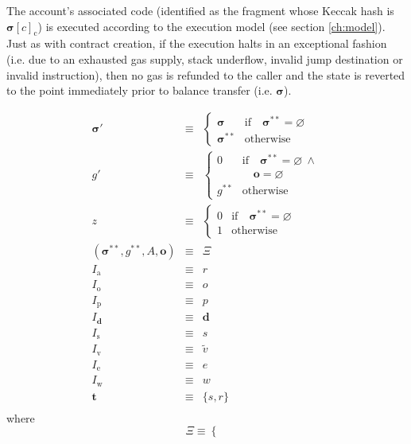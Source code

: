 \documentclass[9pt,oneside]{amsart}
\begin{document}
\begin{multicols}{2}
The account's associated code (identified as the fragment whose Keccak hash is $\boldsymbol{\sigma}[c]_{\mathrm{c}}$) is executed according to the execution model (see section \ref{ch:model}). Just as with contract creation, if the execution halts in an exceptional fashion (i.e. due to an exhausted gas supply, stack underflow, invalid jump destination or invalid instruction), then no gas is refunded to the caller and the state is reverted to the point immediately prior to balance transfer (i.e. $\boldsymbol{\sigma}$).

\begin{eqnarray}
\boldsymbol{\sigma}' & \equiv & \begin{cases}
\boldsymbol{\sigma} & \text{if} \quad \boldsymbol{\sigma}^{**} = \varnothing \\
\boldsymbol{\sigma}^{**} & \text{otherwise}
\end{cases} \\
g' & \equiv & \begin{cases}
0 & \text{if} \quad \boldsymbol{\sigma}^{**} = \varnothing \ \wedge \\
&\quad \mathbf{o} = \varnothing \\
g^{**} & \text{otherwise}
\end{cases} \\ \nonumber
z & \equiv & \begin{cases}
0 & \text{if} \quad \boldsymbol{\sigma}^{**} = \varnothing \\
1 & \text{otherwise}
\end{cases} \\
(\boldsymbol{\sigma}^{**}, g^{**},A, \mathbf{o}) & \equiv & \Xi\\
I_{\mathrm{a}} & \equiv & r \\
I_{\mathrm{o}} & \equiv & o \\
I_{\mathrm{p}} & \equiv & p \\
I_{\mathbf{d}} & \equiv & \mathbf{d} \\
I_{\mathrm{s}} & \equiv & s \\
I_{\mathrm{v}} & \equiv & \tilde{v} \\
I_{\mathrm{e}} & \equiv & e \\
I_{\mathrm{w}} & \equiv & w \\
\mathbf{t} & \equiv & \{s, r\} \\
\end{eqnarray}
\nopagebreak[1]where
\begin{equation}
\Xi \equiv \begin{cases}

\end{cases}
\end{equation}
\end{multicols}
\end{document}
